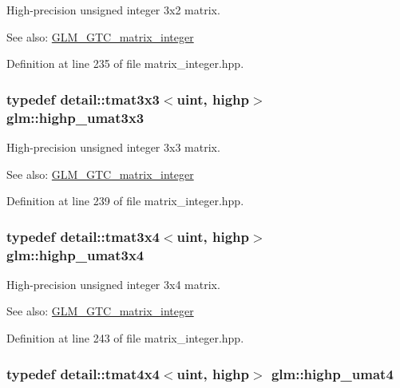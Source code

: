 High-precision unsigned integer 3x2 matrix. \begin{Desc}
\item[See also:]\hyperlink{group__gtc__matrix__integer}{GLM\_\-GTC\_\-matrix\_\-integer} \end{Desc}


Definition at line 235 of file matrix\_\-integer.hpp.\hypertarget{group__gtc__matrix__integer_g8dd9f8bfe06de34c8f1a942d2c2e094c}{
\subsubsection[highp\_\-umat3x3]{\setlength{\rightskip}{0pt plus 5cm}typedef detail::tmat3x3$<$uint, highp$>$ {\bf glm::highp\_\-umat3x3}}}
\label{group__gtc__matrix__integer_g8dd9f8bfe06de34c8f1a942d2c2e094c}


High-precision unsigned integer 3x3 matrix. \begin{Desc}
\item[See also:]\hyperlink{group__gtc__matrix__integer}{GLM\_\-GTC\_\-matrix\_\-integer} \end{Desc}


Definition at line 239 of file matrix\_\-integer.hpp.\hypertarget{group__gtc__matrix__integer_gbaeb2363acd07cc7f99918bae48ccc05}{
\subsubsection[highp\_\-umat3x4]{\setlength{\rightskip}{0pt plus 5cm}typedef detail::tmat3x4$<$uint, highp$>$ {\bf glm::highp\_\-umat3x4}}}
\label{group__gtc__matrix__integer_gbaeb2363acd07cc7f99918bae48ccc05}


High-precision unsigned integer 3x4 matrix. \begin{Desc}
\item[See also:]\hyperlink{group__gtc__matrix__integer}{GLM\_\-GTC\_\-matrix\_\-integer} \end{Desc}


Definition at line 243 of file matrix\_\-integer.hpp.\hypertarget{group__gtc__matrix__integer_gf12f0d2744e809e64469d27ef392aa98}{
\subsubsection[highp\_\-umat4]{\setlength{\rightskip}{0pt plus 5cm}typedef detail::tmat4x4$<$uint, highp$>$ {\bf glm::highp\_\-umat4}}}
\label{group__gtc__matrix__integer_gf12f0d2744e809e64469d27ef392aa98}


